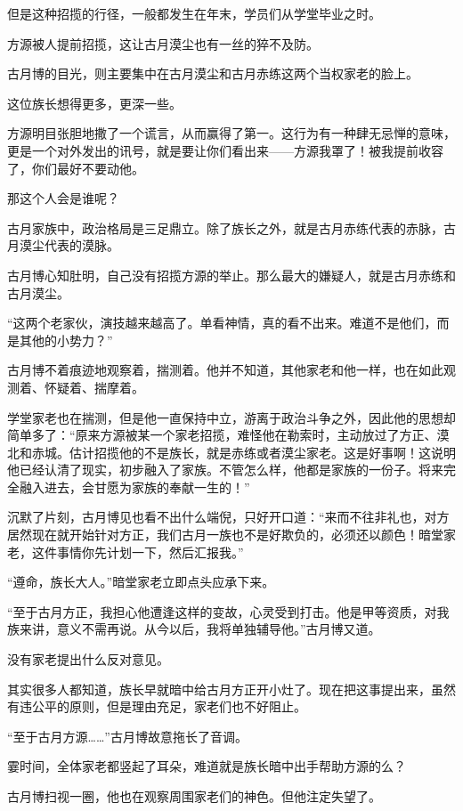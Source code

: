 \begin{this_body}
但是这种招揽的行径，一般都发生在年末，学员们从学堂毕业之时。

方源被人提前招揽，这让古月漠尘也有一丝的猝不及防。

古月博的目光，则主要集中在古月漠尘和古月赤练这两个当权家老的脸上。

这位族长想得更多，更深一些。

方源明目张胆地撒了一个谎言，从而赢得了第一。这行为有一种肆无忌惮的意味，更是一个对外发出的讯号，就是要让你们看出来——方源我罩了！被我提前收容了，你们最好不要动他。

那这个人会是谁呢？

古月家族中，政治格局是三足鼎立。除了族长之外，就是古月赤练代表的赤脉，古月漠尘代表的漠脉。

古月博心知肚明，自己没有招揽方源的举止。那么最大的嫌疑人，就是古月赤练和古月漠尘。

“这两个老家伙，演技越来越高了。单看神情，真的看不出来。难道不是他们，而是其他的小势力？”

古月博不着痕迹地观察着，揣测着。他并不知道，其他家老和他一样，也在如此观测着、怀疑着、揣摩着。

学堂家老也在揣测，但是他一直保持中立，游离于政治斗争之外，因此他的思想却简单多了：“原来方源被某一个家老招揽，难怪他在勒索时，主动放过了方正、漠北和赤城。估计招揽他的不是族长，就是赤练或者漠尘家老。这是好事啊！这说明他已经认清了现实，初步融入了家族。不管怎么样，他都是家族的一份子。将来完全融入进去，会甘愿为家族的奉献一生的！”

沉默了片刻，古月博见也看不出什么端倪，只好开口道：“来而不往非礼也，对方居然现在就开始针对方正，我们古月一族也不是好欺负的，必须还以颜色！暗堂家老，这件事情你先计划一下，然后汇报我。”

“遵命，族长大人。”暗堂家老立即点头应承下来。

“至于古月方正，我担心他遭逢这样的变故，心灵受到打击。他是甲等资质，对我族来讲，意义不需再说。从今以后，我将单独辅导他。”古月博又道。

没有家老提出什么反对意见。

其实很多人都知道，族长早就暗中给古月方正开小灶了。现在把这事提出来，虽然有违公平的原则，但是理由充足，家老们也不好阻止。

“至于古月方源……”古月博故意拖长了音调。

霎时间，全体家老都竖起了耳朵，难道就是族长暗中出手帮助方源的么？

古月博扫视一圈，他也在观察周围家老们的神色。但他注定失望了。


\end{this_body}
